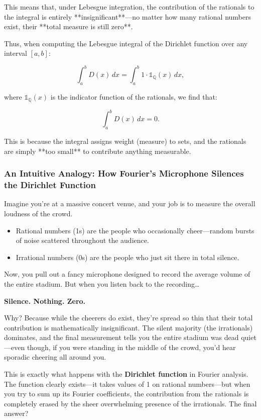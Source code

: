 This means that, under Lebesgue integration, the contribution of the rationals to the integral is entirely **insignificant**—no matter how many rational numbers exist, their **total measure is still zero**.

Thus, when computing the Lebesgue integral of the Dirichlet function over any interval \( [a, b] \):

\[
\int_a^b D(x) \,dx = \int_a^b 1 \cdot \mathbb{1}_{\mathbb{Q}}(x) \,dx,
\]

where \( \mathbb{1}_{\mathbb{Q}}(x) \) is the indicator function of the rationals, we find that:

\[
\int_a^b D(x) \,dx = 0.
\]

This is because the integral assigns weight (measure) to sets, and the rationals are simply **too small** to contribute anything measurable.

\subsubsection{An Intuitive Analogy: How Fourier’s Microphone Silences the Dirichlet Function}

Imagine you’re at a massive concert venue, and your job is to measure the overall loudness of the crowd.

\begin{itemize}
    \item Rational numbers (1s) are the people who occasionally cheer—random bursts of noise scattered throughout the audience.
    \item Irrational numbers (0s) are the people who just sit there in total silence.
\end{itemize}

Now, you pull out a fancy microphone designed to record the average volume of the entire stadium. But when you listen back to the recording…  

\textbf{Silence. Nothing. Zero.}  

Why? Because while the cheerers do exist, they’re spread so thin that their total contribution is mathematically insignificant. The silent majority (the irrationals) dominates, and the final measurement tells you the entire stadium was dead quiet—even though, if you were standing in the middle of the crowd, you’d hear sporadic cheering all around you.  

This is exactly what happens with the \textbf{Dirichlet function} in Fourier analysis. The function clearly exists—it takes values of 1 on rational numbers—but when you try to sum up its Fourier coefficients, the contribution from the rationals is completely erased by the sheer overwhelming presence of the irrationals. The final answer?  

